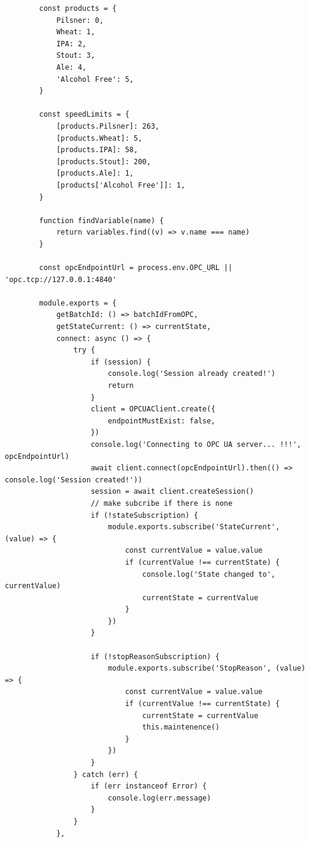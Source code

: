 \begin{center}
\begin{verbatim}
        const products = {
            Pilsner: 0,
            Wheat: 1,
            IPA: 2,
            Stout: 3,
            Ale: 4,
            'Alcohol Free': 5,
        }

        const speedLimits = {
            [products.Pilsner]: 263,
            [products.Wheat]: 5,
            [products.IPA]: 58,
            [products.Stout]: 200,
            [products.Ale]: 1,
            [products['Alcohol Free']]: 1,
        }

        function findVariable(name) {
            return variables.find((v) => v.name === name)
        }

        const opcEndpointUrl = process.env.OPC_URL || 'opc.tcp://127.0.0.1:4840'

        module.exports = {
            getBatchId: () => batchIdFromOPC,
            getStateCurrent: () => currentState,
            connect: async () => {
                try {
                    if (session) {
                        console.log('Session already created!')
                        return
                    }
                    client = OPCUAClient.create({
                        endpointMustExist: false,
                    })
                    console.log('Connecting to OPC UA server... !!!', opcEndpointUrl)
                    await client.connect(opcEndpointUrl).then(() => console.log('Session created!'))
                    session = await client.createSession()
                    // make subcribe if there is none
                    if (!stateSubscription) {
                        module.exports.subscribe('StateCurrent', (value) => {
                            const currentValue = value.value
                            if (currentValue !== currentState) {
                                console.log('State changed to', currentValue)
                                currentState = currentValue
                            }
                        })
                    }

                    if (!stopReasonSubscription) {
                        module.exports.subscribe('StopReason', (value) => {
                            const currentValue = value.value
                            if (currentValue !== currentState) {
                                currentState = currentValue
                                this.maintenence()
                            }
                        })
                    }
                } catch (err) {
                    if (err instanceof Error) {
                        console.log(err.message)
                    }
                }
            },


\end{verbatim}
\end{center}
